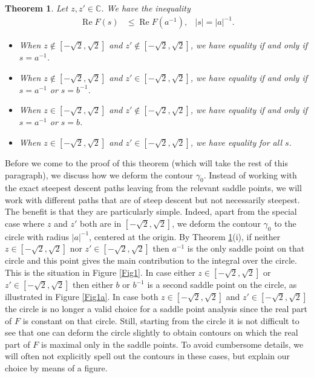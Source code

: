 \documentclass[%
 jmp,
cp,  %
 amsmath,amsthm,amssymb,%
 reprint,%
onecolumn]{revtex4-2}
\newtheorem{theorem}{Theorem}[section]
\begin{document}
\begin{theorem} \label{lem:as=1}
Let $z,z' \in\mathbb C$. We have the inequality
\begin{align} \label{eq:as=1}
\operatorname{Re} F(s) &\leq \operatorname{Re} F(a^{-1}), & |s| = |a|^{-1}.
\end{align} 
\begin{itemize}
\item[(i)] When $z\not\in [-\sqrt 2, \sqrt 2]$ and $z'\not\in [-\sqrt 2, \sqrt 2]$, we have equality if and only if $s = a^{-1}$.
\item[(ii)] When $z\not\in [-\sqrt 2, \sqrt 2]$ and $z'\in [-\sqrt 2, \sqrt 2]$, we have equality if and only if $s = a^{-1}$ or $s=b^{-1}$. 
\item[(iii)] When $z\in [-\sqrt 2, \sqrt 2]$ and $z'\not\in [-\sqrt 2, \sqrt 2]$, we have equality if and only if $s = a^{-1}$ or $s=b$.
\item[(iv)] When $z\in [-\sqrt 2, \sqrt 2]$ and $z'\in [-\sqrt 2, \sqrt 2]$, we have equality for all $s$. 
\end{itemize}
\end{theorem}
Before we come to the proof of this theorem (which will take the rest of this paragraph), we discuss how we deform the contour $\gamma_0$.  Instead of working with the exact steepest descent paths leaving from the relevant saddle points, we will work with different paths that are of steep descent but not necessarily steepest. The benefit is that they are particularly simple. Indeed, apart from the  special case where $z$ and $z'$ both are in $[-\sqrt 2, \sqrt 2]$, we deform the contour $\gamma_0$ to the circle with radius $|a|^{-1}$, centered at the origin. By Theorem \ref{lem:as=1}(i), if neither $z \in [-\sqrt 2, \sqrt 2]$ nor $z' \in [-\sqrt 2, \sqrt 2]$ then $a^{-1}$ is the only saddle point on that circle and this point gives the main contribution to the integral over the circle. This is the situation in Figure \ref{Fig1}.  In case either $z \in [-\sqrt 2, \sqrt 2]$  or $z' \in [-\sqrt 2, \sqrt 2]$ then  either $b$ or $b^{-1}$ is a second saddle point on the circle, as illustrated in Figure \ref{Fig1a}. In case both $z \in [-\sqrt 2, \sqrt 2]$  and $z' \in [-\sqrt 2, \sqrt 2]$ the circle is no longer a valid choice for a saddle point analysis since the real part of $F$ is constant on that circle. Still, starting from the circle it is not difficult to see that one can deform the circle slightly to obtain contours on which the real part of $F$ is maximal only in the saddle points. To avoid cumbersome details, we will often not explicitly spell out the contours in these cases, but explain our choice by means of a figure. 
\end{document}
